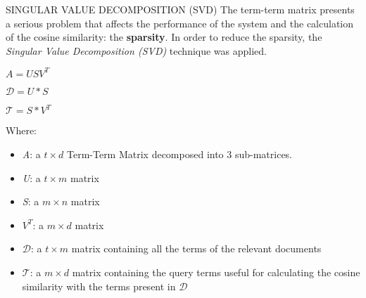 \begin{frame}{SINGULAR VALUE DECOMPOSITION (SVD)}
    The term-term matrix presents a serious problem that affects 
    the performance of the system and the calculation of the cosine similarity: 
    the {\bfseries{sparsity}}. In order to reduce the sparsity, the \emph{Singular 
    Value Decomposition (SVD)} technique was applied.
    \begin{minipage}{\linewidth}
        \centering
        \begin{minipage}{0.20\linewidth}
            \begin{block}{}
                \centering $ A = USV^T $
            \end{block}
            \begin{block}{}
                \centering $ \mathcal{D} = U*S $
            \end{block}
            \begin{block}{}
                \centering $ \mathcal{T} = S*V^T $
            \end{block}
        \end{minipage}
        \hspace{0.05\linewidth}
        \begin{minipage}{0.60\linewidth}
            Where:
            \begin{itemize}
                \item \emph{A}: a $t\times d$ Term-Term Matrix decomposed into 3 sub-matrices.
                \item \emph{U}: a $t\times m$ matrix
                \item \emph{S}: a $m\times n$ matrix
                \item \emph{$V^T$}: a $m\times d$ matrix
                \item \emph{$\mathcal{D}$}: a $t\times m$ matrix containing all the terms of the relevant documents
                \item \emph{$\mathcal{T}$}: a $m\times d$ matrix containing the query terms useful for calculating the cosine similarity with the terms present in $\mathcal{D}$
            \end{itemize}
        \end{minipage}
    \end{minipage}
\end{frame}

